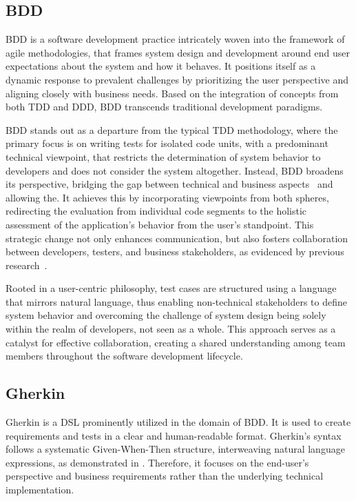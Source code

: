 \label{sec:background}
\subsection{\acl{BDD}}
\label{subsec:bdd}
\acf{BDD} is a software development practice intricately woven into the framework of agile methodologies, that frames system design and development around end user expectations about the system and how it behaves. It positions itself as a dynamic response to prevalent challenges by prioritizing the user perspective and aligning closely with business needs. Based on the integration of concepts from both \ac{TDD} and \ac{DDD}, \ac{BDD} transcends traditional development paradigms.

\ac{BDD} stands out as a departure from the typical \ac{TDD} methodology, where the primary focus is on writing tests for isolated code units, with a predominant technical viewpoint, that restricts the determination of system behavior to developers and does not consider the system altogether. Instead, \ac{BDD} broadens its perspective, bridging the gap between technical and business aspects~\cite{Farooq2023bdd,Binamungu2020bdd} and allowing the. It achieves this by incorporating viewpoints from both spheres, redirecting the evaluation from individual code segments to the holistic assessment of the application's behavior from the user's standpoint. This strategic change not only enhances communication, but also fosters collaboration between developers, testers, and business stakeholders, as evidenced by previous research~\cite{smart2023bdd,pereira2018behavior}.

Rooted in a user-centric philosophy, test cases are structured using a language that mirrors natural language, thus enabling non-technical stakeholders to define system behavior and overcoming the challenge of system design being solely within the realm of developers, not seen as a whole. This approach serves as a catalyst for effective collaboration, creating a shared understanding among team members throughout the software development lifecycle.

\subsection{Gherkin}
\label{subsec:gherkin}

Gherkin is a \ac{DSL} prominently utilized in the domain of \ac{BDD}. It is used to create requirements and tests in a clear and human-readable format. Gherkin's syntax follows a systematic Given-When-Then structure, interweaving natural language expressions, as demonstrated in . Therefore, it focuses on the end-user's perspective and business requirements rather than the underlying technical implementation.

